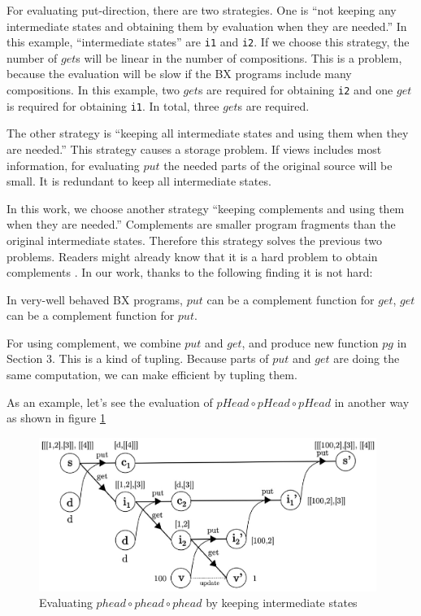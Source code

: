 For evaluating put-direction, there are two strategies. One is ``not keeping any intermediate states and obtaining them by evaluation when they are needed.'' In this example, ``intermediate states'' are \texttt{i1} and \texttt{i2}.
If we choose this strategy, the number of $get$s will be linear in the number of compositions. This is a problem, because the evaluation will be slow if the BX programs include many compositions. In this example, two $get$s are required for obtaining \texttt{i2} and one $get$ is required for obtaining \texttt{i1}. In total, three $get$s are required.

The other strategy is ``keeping all intermediate states and using them when they are needed.'' This strategy causes a storage problem. If views includes most information, for evaluating $put$ the needed parts of the original source will be small. It is redundant to keep all intermediate states.

In this work, we choose another strategy ``keeping complements and using them when they are needed.'' Complements are smaller program fragments than the original intermediate states. Therefore this strategy solves the previous two problems.
Readers might already know that it is a hard problem to obtain complements \cite{}. In our work, thanks to the following finding it is not hard:

\vspace{2mm}
In very-well behaved BX programs, 
$put$ can be a complement function for $get$, $get$ can be a complement function for $put$.
\vspace{2mm}

For using complement, we combine $put$ and $get$, and produce new function $pg$ in Section 3.
This is a kind of tupling. Because parts of $put$ and $get$ are doing the same computation, we can make efficient by tupling them.

As an example, let's see the evaluation of $pHead \circ pHead \circ pHead$ in another way as shown in figure \ref{fig:eval-comp-phead-2}

\begin{figure}[!htb]
  \centering
  \includegraphics[height=5cm]{./fig/fig3.eps}
  \caption{Evaluating $phead \circ phead \circ phead$ by keeping intermediate states}
  \label{fig:eval-comp-phead-2}
\end{figure}

